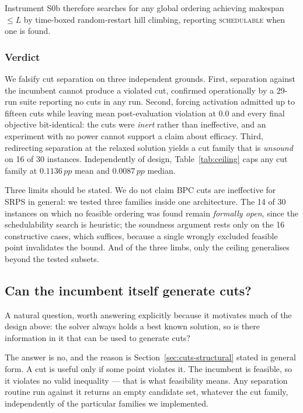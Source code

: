 \documentclass[11pt,a4paper]{article}
\newcommand{\pp}{\,pp}
\begin{document}
Instrument S0b therefore searches for any global ordering achieving makespan
$\le L$ by time-boxed random-restart hill climbing, reporting \textsc{schedulable}
when one is found.



\subsubsection{Verdict}\label{sec:cuts-verdict}

We falsify cut separation on three independent grounds. First, separation
against the
incumbent cannot produce a violated cut, confirmed operationally by a 29-run suite
reporting no cuts in any run. Second, forcing activation admitted up to fifteen
cuts while leaving mean post-evaluation violation at $0.0$ and every final
objective bit-identical: the cuts were \emph{inert} rather than ineffective, and an
experiment with no power cannot support a claim about efficacy. Third, redirecting
separation at the relaxed solution yields a cut family that is \emph{unsound} on
16 of 30 instances. Independently of design, Table~\ref{tab:ceiling} caps any cut
family at $0.1136\pp$ mean and $0.0087\pp$ median.

Three limits should be stated. We do not claim BPC cuts are ineffective for SRPS
in general: we tested three families inside one architecture. The 14 of 30
instances on which no feasible ordering was found remain \emph{formally open},
since the schedulability search is heuristic; the soundness argument rests only on
the 16 constructive cases, which suffices, because a single wrongly excluded
feasible point invalidates the bound. And of the three limbs, only the ceiling
generalises beyond the tested subsets.

\subsection{Can the incumbent itself generate cuts?}\label{sec:incumbent-cuts}

A natural question, worth answering explicitly because it motivates much of the
design above: the solver always holds a best known solution, so is there
information in it that can be used to generate cuts?

The answer is no, and the reason is Section~\ref{sec:cuts-structural} stated in
general form. A cut is useful only if some point violates it. The incumbent is
feasible, so it violates no valid inequality --- that is what feasibility means.
Any separation routine run against it returns an empty candidate set, whatever the
cut family, independently of the particular families we implemented.
\end{document}

